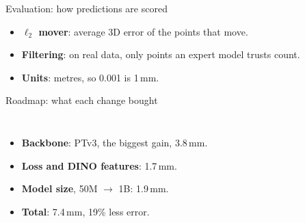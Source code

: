 \documentclass[aspectratio=169,12pt]{beamer}
\newcommand{\pw}[1]{{\color{pw}#1}}
\newenvironment{notes}[1][\linewidth]
  {\begin{minipage}{#1}\footnotesize\begin{itemize}\setlength{\itemsep}{2pt}}
  {\end{itemize}\end{minipage}}
\begin{document}
\begin{frame}[label=eval]{Evaluation: how predictions are scored}
  \centering
  \vfill
  \begin{notes}[\linewidth]
    \item<1-> \textbf{$\ell_2$ mover}: average 3D error of the points that move.
    \item<2-> \textbf{Filtering}: on real data, only points an expert model trusts count.
    \item<3-> \textbf{Units}: \pw{metres, so 0.001 is 1\,mm.}
  \end{notes}
  \vfill
\end{frame}

\begin{frame}[label=roadmap]{Roadmap: what each change bought}
  \begin{columns}[c]
      \centering
      \footnotesize
      \begin{itemize}\setlength{\itemsep}{10pt}
        \item<1-> \textbf{Backbone}: PTv3, the biggest gain, 3.8\,mm.
        \item<2-> \textbf{Loss and DINO features}: 1.7\,mm.
        \item<3-> \textbf{Model size}, 50M $\to$ 1B: 1.9\,mm.
        \item<4-> \textbf{Total}: \pw{7.4\,mm, 19\% less error.}
      \end{itemize}
  \end{columns}
\end{frame}
\end{document}
